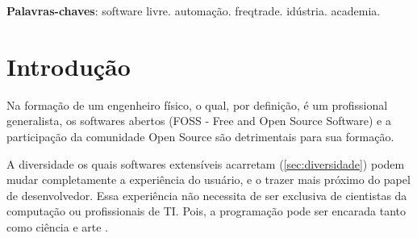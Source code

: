 \documentclass[
12pt,				%
openright,			%
oneside,			%
a4paper,			%
english,			%
french,				%
spanish,			%
brazil,				%
]{abntex2}
\begin{document}

\frenchspacing


\imprimircapa


\setlength{\absparsep}{18pt} %
\begin{resumo}
  
  
  \noindent
  \textbf{Palavras-chaves}: software livre. automação. freqtrade. idústria. academia.

\end{resumo}


\listoffigures*
\cleardoublepage

\tableofcontents*


\textual

\chapter[Introdução]{Introdução}

Na formação de um engenheiro físico, o qual, por definição, é um profissional generalista, os softwares abertos (FOSS - Free and Open Source Software) e a participação da comunidade Open Source são detrimentais para sua formação.

A diversidade os quais softwares extensíveis acarretam (\autoref{sec:diversidade}) podem mudar completamente a experiência do usuário, e o trazer mais próximo do papel de desenvolvedor. Essa experiência não necessita de ser exclusiva de cientistas da computação ou profissionais de TI. Pois, a programação pode ser encarada tanto como ciência e arte \cite{knuth1968art}.
\end{document}

